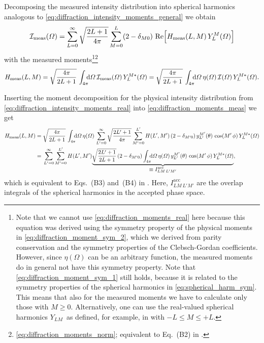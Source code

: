 Decomposing the measured intensity distribution into spherical
harmonics analogous to \cref{eq:diffraction_intensity_moments_general}
we obtain
\begin{equation}
  \label{eq:diffraction_intensity_moments_meas}
  \intensity_\text{meas}(\Omega)
  = \sum_{L = 0}^\infty \sqrt{\frac{2 L + 1}{4 \pi}} \sum_{M = 0}^{L} (2 - \delta_{M 0})\, \Re{H_\text{meas}(L, M)\, Y_L^M(\Omega)}
\end{equation}
with the measured
moments\footnote{\label{fn:complex_moment_decomp}Note that we cannot
use \cref{eq:diffraction_moments_real} here because this equation was
derived using the symmetry property of the physical moments in
\cref{eq:diffraction_moment_sym_2}, which we derived from parity
conservation and the symmetry properties of the Clebsch-Gordan
coefficients.  However, since $\eta(\Omega)$ can be an arbitrary
function, the measured moments do in general not have this symmetry
property.  Note that \cref{eq:diffraction_moment_sym_1} still holds,
because it is related to the symmetry properties of the spherical
harmonics in \cref{eq:spherical_harm_sym}.  This means that also for
the measured moments we have to calculate only those with $M \geq 0$.
Alternatively, one can use the real-valued spherical harmonics $Y_{L
M}$\footnotemark\ as defined, for example, in
 with $-L \leq M \leq
+L$.}\footnote{\Confer
\cref{eq:diffraction_moments_norm}; equivalent to Eq.~(B2) in
.}
\begin{equation}
  \label{eq:diffraction_moments_meas}
  H_\text{meas}(L, M)
  = \sqrt{\frac{4 \pi}{2 L + 1}}\, \int_{4 \pi}\!\!\! \dif{\Omega}\, \intensity_\text{meas}(\Omega)\, Y_L^{M *}(\Omega)
  = \sqrt{\frac{4 \pi}{2 L + 1}}\, \int_{4 \pi}\!\!\! \dif{\Omega}\, \eta(\Omega)\, \intensity(\Omega)\, Y_L^{M *}(\Omega).
\end{equation}

Inserting the moment decomposition for the physical intensity distribution
from \cref{eq:diffraction_intensity_moments_real} into
\cref{eq:diffraction_moments_meas} we get
\begin{align}
  H_\text{meas}(L, M)
  ={}& \sqrt{\frac{4 \pi}{2 L + 1}}\, \int_{4 \pi}\!\!\! \dif{\Omega}\, \eta(\Omega)\,
  \sum_{L' = 0}^\infty \sqrt{\frac{2 L' + 1}{4 \pi}} \sum_{M' = 0}^{L'} H(L', M')\, (2 - \delta_{M' 0})\, y_{L'}^{M'}(\theta)\, \cos(M'\, \phi)\,
  Y_L^{M *}(\Omega) \nonumber \\
  \label{eq:diffraction_moments_meas2}
  ={}& \sum_{L' = 0}^\infty \sum_{M' = 0}^{L'} H(L', M')
  \dUnderbrace{\sqrt{\frac{2 L' + 1}{2 L + 1}}\, (2 - \delta_{M' 0}) \int_{4 \pi}\!\!\! \dif{\Omega}\, \eta(\Omega)\,
  y_{L'}^{M'}(\theta)\, \cos(M'\, \phi)\, Y_L^{M *}(\Omega)}{\equiv I^\text{acc}_{L M\, L' M'}},
\end{align}
which is equivalent to Eqs.~(B3) and~(B4) in .
Here, $I^\text{acc}_{L M\, L' M'}$ are the overlap integrals of the
spherical harmonics in the accepted phase space.

